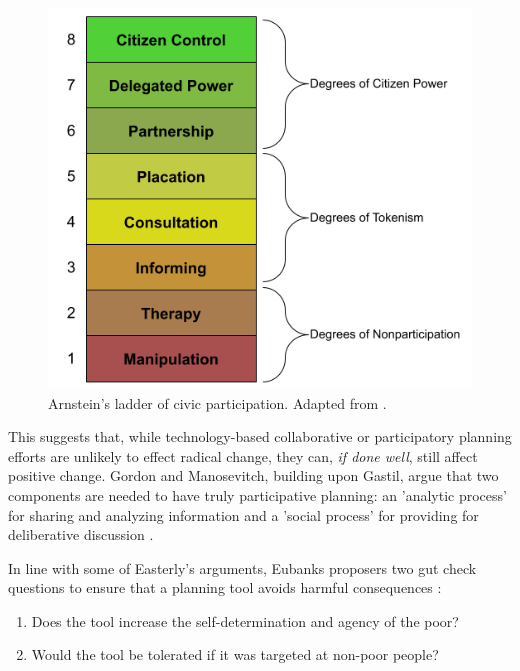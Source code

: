 \begin{figure}[!htb]
	\centering
	\includegraphics[scale=0.5]{Figures/chap2/civic_ladder.png}
	\caption[Arnstein's ladder of civic participation]{Arnstein's ladder of civic participation. Adapted from \cite{arnsteinLadderCitizenParticipation1969}.}
	\label{fig:civic_ladder}
\end{figure}

This suggests that, while technology-based collaborative or participatory planning efforts are unlikely to effect radical change, they can, \textit{if done well}, still affect positive change. Gordon and Manosevitch, building upon Gastil, argue that two components are needed to have truly participative planning: an 'analytic process' for sharing and analyzing information and a 'social process' for providing for deliberative discussion \cite{gordonAugmentedDeliberationMerging2011}. 

In line with some of Easterly's arguments, Eubanks proposers two gut check questions to ensure that a planning tool avoids harmful consequences \cite{eubanksAutomatingInequalityHow2018}:

\begin{enumerate} \setlength{\itemsep}{0pt} \setlength{\parskip}{0pt} 
	\item{Does the tool increase the self-determination and agency of the poor?}
	\item{Would the tool be tolerated if it was targeted at non-poor people?}
\end{enumerate}

